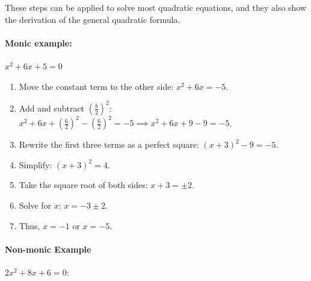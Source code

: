 \documentclass[12pt]{article}
\begin{document}
These steps can be applied to solve most quadratic equations, and they also show the derivation of the general quadratic formula.

\paragraph{Monic example:} $x^2 + 6x + 5 = 0$
\begin{enumerate}
    \item Move the constant term to the other side: $x^2 + 6x = -5$.

    \item Add and subtract $(\frac{b}{2})^2$:\\
    
    $x^2 + 6x + (\frac{6}{2})^2 - (\frac{6}{2})^2 = -5 \implies x^2 + 6x + 9 - 9 = -5$.
    
    \item Rewrite the first three terms as a perfect square: $(x + 3)^2 - 9 = -5$.
    \item Simplify: $(x + 3)^2 = 4$.
    \item Take the square root of both sides: $x + 3 = \pm 2$.
    \item Solve for $x$: $x = -3 \pm 2$.
    \item Thus, $x = -1$ or $x = -5$.
\end{enumerate}

\newpage

\paragraph{Non-monic Example}
$2x^2 + 8x + 6 = 0$:
\end{document}
